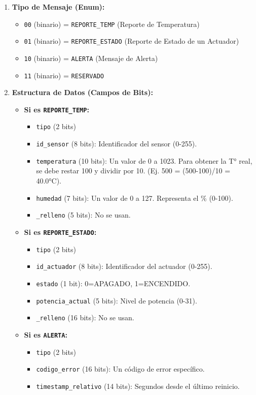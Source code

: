 \begin{enumerate}
    \item \textbf{Tipo de Mensaje (Enum):}
    \begin{itemize}
        \item \texttt{00} (binario) = \texttt{REPORTE\_TEMP} (Reporte de Temperatura)
        \item \texttt{01} (binario) = \texttt{REPORTE\_ESTADO} (Reporte de Estado de un Actuador)
        \item \texttt{10} (binario) = \texttt{ALERTA} (Mensaje de Alerta)
        \item \texttt{11} (binario) = \texttt{RESERVADO}
    \end{itemize}

    \item \textbf{Estructura de Datos (Campos de Bits):}
    \begin{itemize}
        \item \textbf{Si es \texttt{REPORTE\_TEMP}:}
        \begin{itemize}
            \item \texttt{tipo} (2 bits)
            \item \texttt{id\_sensor} (8 bits): Identificador del sensor (0-255).
            \item \texttt{temperatura} (10 bits): Un valor de 0 a 1023. Para obtener la T° real, se debe restar 100 y dividir por 10. (Ej. 500 = (500-100)/10 = 40.0°C).
            \item \texttt{humedad} (7 bits): Un valor de 0 a 127. Representa el \% (0-100).
            \item \texttt{\_relleno} (5 bits): No se usan.
        \end{itemize}

        \item \textbf{Si es \texttt{REPORTE\_ESTADO}:}
        \begin{itemize}
            \item \texttt{tipo} (2 bits)
            \item \texttt{id\_actuador} (8 bits): Identificador del actuador (0-255).
            \item \texttt{estado} (1 bit): 0=APAGADO, 1=ENCENDIDO.
            \item \texttt{potencia\_actual} (5 bits): Nivel de potencia (0-31).
            \item \texttt{\_relleno} (16 bits): No se usan.
        \end{itemize}

        \item \textbf{Si es \texttt{ALERTA}:}
        \begin{itemize}
            \item \texttt{tipo} (2 bits)
            \item \texttt{codigo\_error} (16 bits): Un código de error específico.
            \item \texttt{timestamp\_relativo} (14 bits): Segundos desde el último reinicio.
        \end{itemize}
    \end{itemize}
\end{enumerate}

